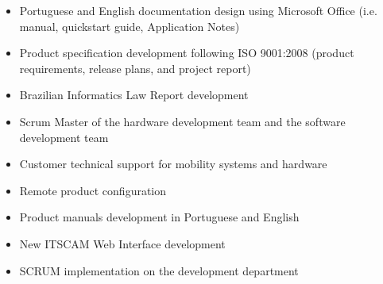 \documentclass[10pt,a4paper,ragged2e]{altacv}
\begin{document}
  \begin{itemize}
    \item Portuguese and English documentation design using Microsoft Office (i.e. manual, quickstart guide, Application Notes)
    \item Product specification development following ISO 9001:2008 (product requirements, release plans, and project report)
    \item Brazilian Informatics Law Report development
    \item Scrum Master of the hardware development team and the software development team
  \end{itemize}
  \divider

  \begin{itemize}
    \item Customer technical support for mobility systems and hardware
    \item Remote product configuration
    \item Product manuals development in Portuguese and English
    \item New ITSCAM Web Interface development
    \item SCRUM implementation on the development department
  \end{itemize}
\end{document}
